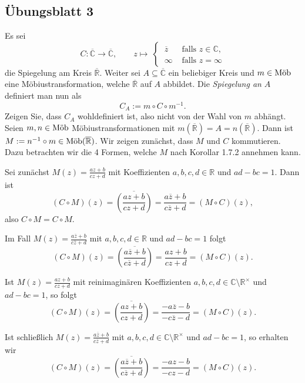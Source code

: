 \documentclass[11pt]{book}
\numberwithin{dummy}{section}
\theoremstyle{nonumberbreak}
\newenvironment{prob}[1][]{\ifthenelse{\equal{#1}{}}{\problem}{\problem[#1]}\rm}{\endproblem}
\newenvironment{sol}[1][]{\ifthenelse{\equal{#1}{}}{\solution}{\solution[#1]}\rm}{\endsolution}
\newcommand{\C}{\mathbb{C}}
\newcommand{\R}{\mathbb{R}}
\newcommand{\RR}{\overline{\mathbb{R}}}
\newcommand{\CC}{\overline{\mathbb{C}}}
\newcommand{\la}{\longrightarrow}
\newcommand{\amob}{\textup{Möb}}
\begin{document}
\begin{spacing}{1.4}
\section{Übungsblatt 3} %
\renewcommand*\thesection{\arabic{section}}







\begin{prob}    %
Es sei 
$$C: \CC \la \CC, \qquad z \mapsto \ \begin{cases} \ \overline{z} & \textrm{ falls }z \in \C, \\ \ \infty & \textrm{ falls }z=\infty \end{cases}$$
die Spiegelung am Kreis $\RR$. Weiter sei $A \subseteq \CC$ ein beliebiger Kreis und $m\in \amob$ eine Möbiustransformation, welche $\RR$ auf $A$ abbildet. Die \textit{Spiegelung an} $A$ definiert man nun als
$$C_A:=m\circ C \circ m^{-1}.$$
Zeigen Sie, dass $C_A$ wohldefiniert ist, also nicht von der Wahl von $m$ abhängt.
\begin{sol}
Seien $m,n \in \amob$ Möbiustransformationen mit $m(\RR)=A=n(\RR)$. Dann ist $M:= n^{-1} \circ m \in \amob(\RR)$. Wir zeigen zunächst, dass $M$ und $C$ kommutieren. Dazu betrachten wir die 4 Formen, welche $M$ nach Korollar 1.7.2 annehmen kann.
\begin{compactenum}
\item Sei zunächst $M(z)=\frac{az+b}{cz+d}$ mit Koeffizienten $a,b,c,d \in \R$ und $ad-bc=1$. Dann ist 
$$(C\circ M)(z)=\overline{\left( \frac{az+b}{cz+d}\right)}= \frac{a\overline{z}+b}{c\overline{z}+d} = (M \circ C)(z),$$
also $C\circ M=C \circ M$.
\item Im Fall $M(z)=\frac{a\overline{z}+b}{c\overline{z}+d}$ mit $a,b,c,d \in \R$ und $ad-bc=1$ folgt 
$$(C\circ M)(z)=\overline{\left(\frac{a\overline{z}+b}{c\overline{z}+d}\right)}= \frac{az+b}{cz+d} = (M\circ C)(z).$$
\item Ist $M(z)=\frac{az+b}{cz+d}$ mit reinimaginären Koeffizienten $a,b,c,d \in \C \setminus \R^{\times}$ und $ad-bc=1$, so folgt
$$(C\circ M)(z)=\overline{\left(\frac{az+b}{cz+d}\right)}= \frac{-a\overline{z}-b}{-c\overline{z}-d} = (M \circ C)(z).$$
\item Ist schließlich $M(z)=\frac{a\overline{z}+b}{c\overline{z}+d}$ mit $a,b,c,d \in \C \setminus \R^{\times}$ und $ad-bc=1$, so erhalten wir
$$(C\circ M)(z)=\overline{\left(\frac{a\overline{z}+b}{c\overline{z}+d}\right)}= \frac{-az-b}{-cz-d} = (M\circ C)(z).$$


\end{compactenum}
\end{sol}
\end{prob}
\end{spacing}
\end{document}
